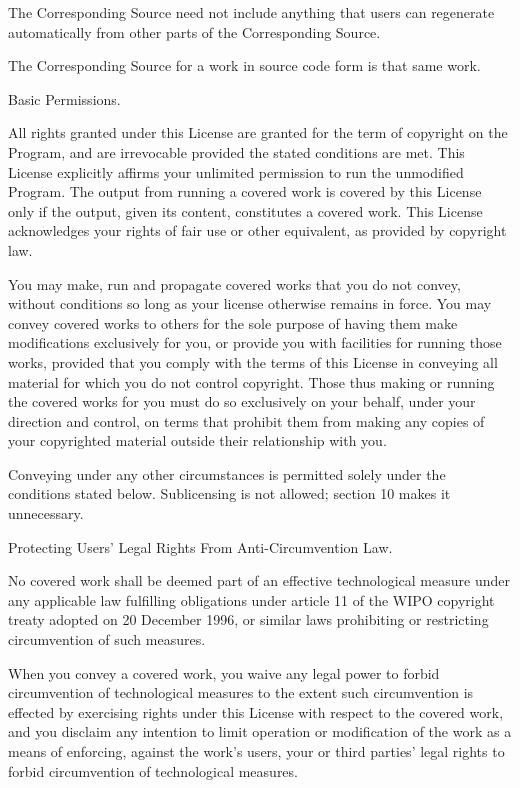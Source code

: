 The Corresponding Source need not include anything that users can regenerate automatically from other parts of the Corresponding Source.

The Corresponding Source for a work in source code form is that same work.


\begin{DoxyEnumerate}
\item Basic Permissions.
\end{DoxyEnumerate}

All rights granted under this License are granted for the term of copyright on the Program, and are irrevocable provided the stated conditions are met. This License explicitly affirms your unlimited permission to run the unmodified Program. The output from running a covered work is covered by this License only if the output, given its content, constitutes a covered work. This License acknowledges your rights of fair use or other equivalent, as provided by copyright law.

You may make, run and propagate covered works that you do not convey, without conditions so long as your license otherwise remains in force. You may convey covered works to others for the sole purpose of having them make modifications exclusively for you, or provide you with facilities for running those works, provided that you comply with the terms of this License in conveying all material for which you do not control copyright. Those thus making or running the covered works for you must do so exclusively on your behalf, under your direction and control, on terms that prohibit them from making any copies of your copyrighted material outside their relationship with you.

Conveying under any other circumstances is permitted solely under the conditions stated below. Sublicensing is not allowed; section 10 makes it unnecessary.


\begin{DoxyEnumerate}
\item Protecting Users' Legal Rights From Anti-\/\-Circumvention Law.
\end{DoxyEnumerate}

No covered work shall be deemed part of an effective technological measure under any applicable law fulfilling obligations under article 11 of the W\-I\-P\-O copyright treaty adopted on 20 December 1996, or similar laws prohibiting or restricting circumvention of such measures.

When you convey a covered work, you waive any legal power to forbid circumvention of technological measures to the extent such circumvention is effected by exercising rights under this License with respect to the covered work, and you disclaim any intention to limit operation or modification of the work as a means of enforcing, against the work's users, your or third parties' legal rights to forbid circumvention of technological measures.


